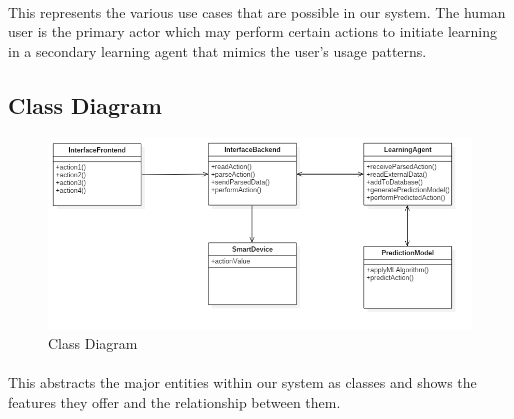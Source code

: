 	\paragraph{}
	This represents the various use cases that are possible in our system. The human user is the primary actor which may perform certain actions to initiate learning in a secondary learning agent that mimics the user's usage patterns.
	
	\subsection{Class Diagram}
	\begin{figure}[H]
	\centering
	\includegraphics[width=\textwidth]{./Chapter5/ClassDiagram}
		\caption{Class Diagram}
	\end{figure}
	
	\paragraph{}
	This abstracts the major entities within our system as classes and shows the features they offer and the relationship between them.


